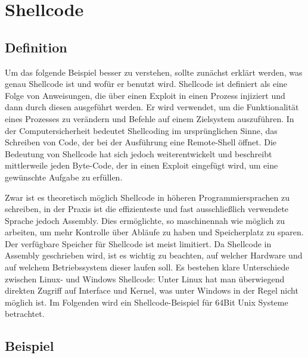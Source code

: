 \section{Shellcode}
\subsection{Definition}
Um das folgende Beispiel besser zu verstehen, sollte zunächst erklärt werden, was genau Shellcode ist und wofür er benutzt wird.
Shellcode ist definiert als eine Folge von Anweisungen, die über einen Exploit in einen Prozess injiziert und
dann durch diesen ausgeführt werden. Er wird verwendet, um die Funktionalität eines Prozesses zu verändern und
Befehle auf einem Zielsystem auszuführen. In der Computersicherheit bedeutet Shellcoding im ursprünglichen Sinne,
das Schreiben von Code, der bei der Ausführung eine Remote-Shell öffnet. Die Bedeutung von Shellcode hat sich jedoch weiterentwickelt und
beschreibt mittlerweile jeden Byte-Code, der in einen Exploit eingefügt wird, um eine gewünschte Aufgabe zu erfüllen.

Zwar ist es theoretisch möglich Shellcode in höheren Programmiersprachen zu schreiben, in der Praxis ist die effizienteste und
fast ausschließlich verwendete Sprache jedoch Assembly. Dies ermöglichte, so maschinennah wie möglich zu arbeiten,
um mehr Kontrolle über Abläufe zu haben und Speicherplatz zu sparen. Der verfügbare Speicher für Shellcode ist meist limitiert.
Da Shellcode in Assembly geschrieben wird, ist es wichtig zu beachten, auf welcher Hardware und auf welchem Betriebssystem dieser laufen soll.
Es bestehen klare Unterschiede zwischen Linux- und Windows Shellcode: Unter Linux hat man überwiegend direkten Zugriff auf Interface und Kernel,
was unter Windows in der Regel nicht möglich ist. Im Folgenden wird ein Shellcode-Beispiel für 64Bit Unix Systeme betrachtet. \cite{tutorial1}

\subsection{Beispiel}

